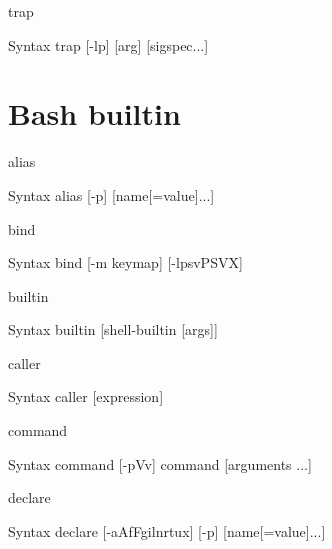 \documentclass[10pt, compress, aspectratio=169]{beamer}
\begin{document}
\begin{frame}{trap}
  \begin{alertblock}{Syntax}
    trap [-lp] [arg] [sigspec...]
  \end{alertblock}
  
\end{frame}

\section{Bash builtin}
\begin{frame}{alias}
  \begin{alertblock}{Syntax}
    alias [-p] [name[=value]...]
  \end{alertblock}
\end{frame}

\begin{frame}{bind}
  \begin{alertblock}{Syntax}
    bind [-m keymap] [-lpsvPSVX]
  \end{alertblock}
\end{frame}

\begin{frame}{builtin}
  \begin{alertblock}{Syntax}
    builtin [shell-builtin [args]]
  \end{alertblock}
\end{frame}

\begin{frame}{caller}
  \begin{alertblock}{Syntax}
    caller [expression]
  \end{alertblock}
  
\end{frame}

\begin{frame}{command}
  \begin{alertblock}{Syntax}
    command [-pVv] command [arguments ...]
  \end{alertblock}
\end{frame}

\begin{frame}{declare}
  \begin{alertblock}{Syntax}
    declare [-aAfFgilnrtux] [-p] [name[=value]...]
  \end{alertblock}
\end{frame}
\end{document}
